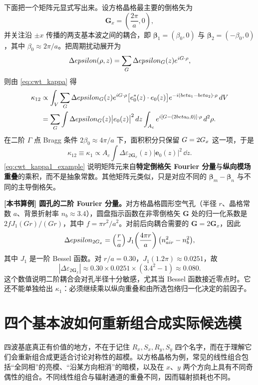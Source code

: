 下面把一个矩阵元显式写出来。设方格晶格最主要的倒格矢为
\[
\bm G_x=\left(\frac{2\pi}{a},0\right),
\]
并关注沿 $\pm x$ 传播的两支基本波之间的耦合，即 $\bm\beta_1=(\beta_0,0)$ 与 $\bm\beta_2=(-\beta_0,0)$，其中 $\beta_0\approx2\pi/a$。把周期扰动展开为
\[
\Delta epsilon(\rho,z)=\sum_{G}\Delta epsilon_{G}(z)e^{iG\cdot\rho},
\]
则由 \cref{eq:cwt_kappa} 得
\begin{align}
\kappa_{12}
&\propto
\int_V
\sum_{G}\Delta epsilon_{G}(z)e^{iG\cdot\rho}
\big[e_0^\ast(z)\cdot e_0(z)\big]
e^{-i(beta_1-beta_2)\cdot\rho}\,d V
\notag\\
&=
\sum_{G}
\int \Delta epsilon_{G}(z)\big|e_0(z)\big|^2\,d z
\int_{A_c}
e^{i[G-(2beta_0,0)]\cdot\rho}\,d^2\rho.
\label{eq:cwt_matrix_element_example}
\end{align}
在二阶 $\Gamma$ 点 Bragg 条件 $2\beta_0\approx4\pi/a$ 下，面积积分只保留 $G=2G_x$ 这一项，于是
\begin{equation}
\kappa_{12}\equiv \kappa_1
\propto
A_c
\int \Delta\varepsilon_{2\bm G_x}(z)\big|\bm e_0(z)\big|^2\,\dd z.
\label{eq:cwt_kappa1_example}
\end{equation}
\cref{eq:cwt_kappa1_example} 说明矩阵元来自\textbf{特定倒格矢 Fourier 分量}与\textbf{纵向模场重叠}的乘积，而不是抽象常数。其他矩阵元类似，只是对应不同的 $\bm\beta_m-\bm\beta_n$ 与不同的主导倒格矢。

\begin{ExampleBox}
\textbf{[本书算例] 圆孔的二阶 Fourier 分量。}对方格晶格圆形空气孔（半径 $r$、晶格常数 $a$、背景折射率 $n_b\approx3.4$），圆盘指示函数在非零倒格矢 $\bm G$ 处的归一化系数是 $2fJ_1(Gr)/(Gr)$，其中 $f=\pi r^2/a^2$。对前后向耦合需要的 $\bm G=2\bm G_x$，因此
\[
\Delta\varepsilon_{2\bm G_x}
=
\left(\frac{r}{a}\right) J_1\!\left(\frac{4\pi r}{a}\right)
\bigl(n_{\rm air}^2-n_b^2\bigr),
\]
其中 $J_1$ 是一阶 Bessel 函数。对 $r/a=0.30$，$J_1(1.2\pi)\approx0.0251$，故
\[
|\Delta\varepsilon_{2\bm G_x}|
\approx0.30\times0.0251\times(3.4^2-1)
\approx0.080.
\]
这个数值说明二阶耦合会对孔半径十分敏感，尤其当 Bessel 函数接近零点时。它还不能单独给出 $\kappa_1$：必须继续乘以纵向重叠和由所选包络归一化决定的前因子。
\end{ExampleBox}

\section{四个基本波如何重新组合成实际候选模}
四波基底真正有价值的地方，不在于记住 $R_x,S_x,R_y,S_y$ 四个名字，而在于理解它们会重新组合成更适合讨论对称性的超模。以方格晶格为例，常见的线性组合包括“全同相”的亮模、“沿某方向相消”的暗模，以及在 $x$、$y$ 两个方向上具有不同奇偶性的组合。不同线性组合与辐射通道的重叠不同，因而辐射损耗也不同。

